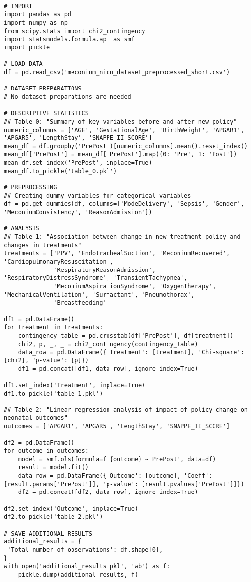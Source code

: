 \documentclass[11pt]{article}
\begin{document}
\begin{verbatim}

# IMPORT
import pandas as pd
import numpy as np
from scipy.stats import chi2_contingency
import statsmodels.formula.api as smf
import pickle

# LOAD DATA
df = pd.read_csv('meconium_nicu_dataset_preprocessed_short.csv')

# DATASET PREPARATIONS
# No dataset preparations are needed

# DESCRIPTIVE STATISTICS
## Table 0: "Summary of key variables before and after new policy"
numeric_columns = ['AGE', 'GestationalAge', 'BirthWeight', 'APGAR1', 'APGAR5', 'LengthStay', 'SNAPPE_II_SCORE']
mean_df = df.groupby('PrePost')[numeric_columns].mean().reset_index()
mean_df['PrePost'] = mean_df['PrePost'].map({0: 'Pre', 1: 'Post'})
mean_df.set_index('PrePost', inplace=True)
mean_df.to_pickle('table_0.pkl')

# PREPROCESSING
## Creating dummy variables for categorical variables
df = pd.get_dummies(df, columns=['ModeDelivery', 'Sepsis', 'Gender', 'MeconiumConsistency', 'ReasonAdmission'])

# ANALYSIS
## Table 1: "Association between change in new treatment policy and changes in treatments"
treatments = ['PPV', 'EndotrachealSuction', 'MeconiumRecovered', 'CardiopulmonaryResuscitation', 
              'RespiratoryReasonAdmission', 'RespiratoryDistressSyndrome', 'TransientTachypnea', 
              'MeconiumAspirationSyndrome', 'OxygenTherapy', 'MechanicalVentilation', 'Surfactant', 'Pneumothorax',
              'Breastfeeding']

df1 = pd.DataFrame()
for treatment in treatments:
    contingency_table = pd.crosstab(df['PrePost'], df[treatment])
    chi2, p, _, _ = chi2_contingency(contingency_table)
    data_row = pd.DataFrame({'Treatment': [treatment], 'Chi-square': [chi2], 'p-value': [p]})
    df1 = pd.concat([df1, data_row], ignore_index=True)

df1.set_index('Treatment', inplace=True)
df1.to_pickle('table_1.pkl')

## Table 2: "Linear regression analysis of impact of policy change on neonatal outcomes"
outcomes = ['APGAR1', 'APGAR5', 'LengthStay', 'SNAPPE_II_SCORE']

df2 = pd.DataFrame()
for outcome in outcomes:
    model = smf.ols(formula=f'{outcome} ~ PrePost', data=df)
    result = model.fit()
    data_row = pd.DataFrame({'Outcome': [outcome], 'Coeff': [result.params['PrePost']], 'p-value': [result.pvalues['PrePost']]})
    df2 = pd.concat([df2, data_row], ignore_index=True)

df2.set_index('Outcome', inplace=True)
df2.to_pickle('table_2.pkl')

# SAVE ADDITIONAL RESULTS
additional_results = {
 'Total number of observations': df.shape[0],
}
with open('additional_results.pkl', 'wb') as f:
    pickle.dump(additional_results, f)

\end{verbatim}
\end{document}
